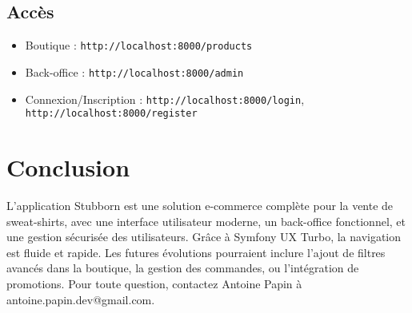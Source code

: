 \documentclass[a4paper,11pt]{article}
\begin{document}
\subsection{Accès}
\begin{itemize}
    \item Boutique : \texttt{http://localhost:8000/products}
    \item Back-office : \texttt{http://localhost:8000/admin}
    \item Connexion/Inscription : \texttt{http://localhost:8000/login}, \texttt{http://localhost:8000/register}
\end{itemize}


\section{Conclusion}
L'application Stubborn est une solution e-commerce complète pour la vente de sweat-shirts, avec une interface utilisateur moderne, un back-office fonctionnel, et une gestion sécurisée des utilisateurs. Grâce à Symfony UX Turbo, la navigation est fluide et rapide. Les futures évolutions pourraient inclure l’ajout de filtres avancés dans la boutique, la gestion des commandes, ou l’intégration de promotions. Pour toute question, contactez Antoine Papin à antoine.papin.dev@gmail.com.

\end{document}
